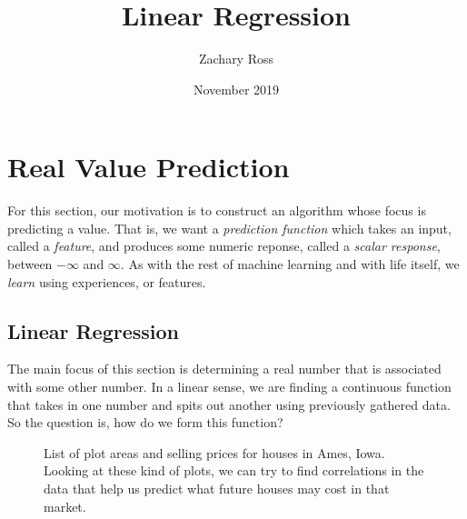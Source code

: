 \documentclass{book}[a5paper]
\title{Linear Regression}
\author{Zachary Ross}
\date{November 2019}
\begin{document}
\section{Real Value Prediction}

For this section, our motivation is to construct an algorithm whose focus is
predicting a value. That is, we want a \emph{prediction function} which takes an
input, called a \emph{feature}, and produces some numeric reponse, called a
\emph{scalar response}, between $-\infty$ and $\infty$. As with the rest of
machine learning and with life itself, we \emph{learn} using experiences, or
features.


\subsection{Linear Regression}


The main focus of this section is determining a real number
that is associated with some other number. In a linear sense, we are finding
a continuous function that takes in one number and spits out another using
previously gathered data. So the question is, how do we form this function?


\begin{figure}[t!]
    \caption{List of plot areas and selling prices for houses in Ames, Iowa.
    Looking at these kind of plots, we can try to find correlations in the data
    that help us predict what future houses may cost in that market.}
    \label{fig:hp}
\end{figure}
\end{document}
